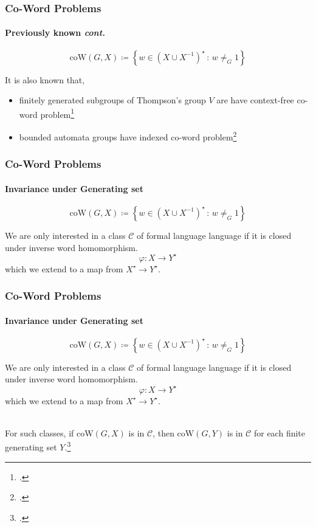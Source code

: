 \documentclass[11pt]{beamer}
\begin{document}
\begin{frame}[t]
\frametitle{Co-Word Problems}
\framesubtitle{\large Previously known \textit{cont.}}


\begin{definition}
	\[
	\mathrm{coW}(G,X)
	\coloneqq
	\left\{
	w \in \left(X \cup X^{-1} \right)^\star
	\, :\,
	w \neq_G 1
	\right\}
	\]
\end{definition}

\vspace*{1em}

It is also known that,

\begin{itemize}
	\item finitely generated subgroups of Thompson's group $V$ are have context-free co-word problem\footcite{lehnert2007}
	
	\item bounded automata groups have indexed co-word problem\footcite{holt2006}
\end{itemize}

\end{frame}


\begin{frame}[t]
\frametitle{Co-Word Problems}
\framesubtitle{\large Invariance under Generating set}

\begin{definition}
	\[
	\mathrm{coW}(G,X)
	\coloneqq
	\left\{
	w \in \left(X \cup X^{-1} \right)^\star
	\, :\,
	w \neq_G 1
	\right\}
	\]
\end{definition}

\vspace*{1em}

We are only interested in a class $\mathcal{C}$ of formal language language if it is closed under inverse word homomorphism.
\pause
\[
	\varphi: X \to Y^\star
\]
which we extend to a map from $X^\star \to Y^\star$.

\end{frame}

\begin{frame}[t]
\frametitle{Co-Word Problems}
\framesubtitle{\large Invariance under Generating set}

\begin{definition}
	\[
	\mathrm{coW}(G,X)
	\coloneqq
	\left\{
	w \in \left(X \cup X^{-1} \right)^\star
	\, :\,
	w \neq_G 1
	\right\}
	\]
\end{definition}

\vspace*{1em}

We are only interested in a class $\mathcal{C}$ of formal language language if it is closed under inverse word homomorphism.
\[
\varphi: X \to Y^\star
\]
which we extend to a map from $X^\star \to Y^\star$.

\ \\

For such classes, if $\mathrm{coW}(G,X)$ is in $\mathcal{C}$, then
$\mathrm{coW}(G,Y)$ is in $\mathcal{C}$ for each finite generating set $Y$.\footcite{holt2005}

\end{frame}
\end{document}

